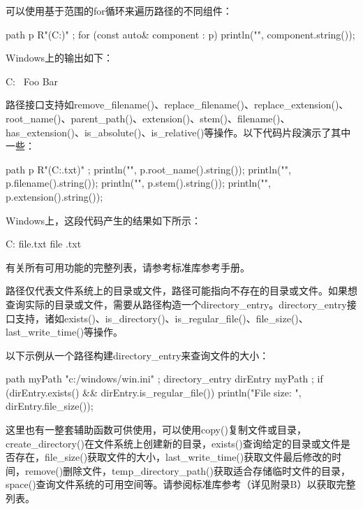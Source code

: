 可以使用基于范围的for循环来遍历路径的不同组件：

\begin{cpp}
path p { R"(C:\Foo\Bar)" };
for (const auto& component : p) {
    println("{}", component.string());
}
\end{cpp}

Windows上的输出如下：

\begin{cpp}
C:
\
Foo
Bar
\end{cpp}

路径接口支持如remove\_filename()、replace\_filename()、replace\_extension()、root\_name()、parent\_path()、extension()、stem()、filename()、has\_extension()、is\_absolute()、is\_relative()等操作。以下代码片段演示了其中一些：

\begin{cpp}
path p { R"(C:\Foo\Bar\file.txt)" };
println("{}", p.root_name().string());
println("{}", p.filename().string());
println("{}", p.stem().string());
println("{}", p.extension().string());
\end{cpp}

Windows上，这段代码产生的结果如下所示：

\begin{shell}
C:
file.txt
file
.txt
\end{shell}

有关所有可用功能的完整列表，请参考标准库参考手册。

\mySubsubsection{13.6.2.}{目录}

路径仅代表文件系统上的目录或文件，路径可能指向不存在的目录或文件。如果想查询实际的目录或文件，需要从路径构造一个directory\_entry。directory\_entry接口支持，诸如exists()、is\_directory()、is\_regular\_file()、file\_size()、last\_write\_time()等操作。

以下示例从一个路径构建directory\_entry来查询文件的大小：

\begin{cpp}
path myPath { "c:/windows/win.ini" };
directory_entry dirEntry { myPath };
if (dirEntry.exists() && dirEntry.is_regular_file()) {
    println("File size: {}", dirEntry.file_size());
}
\end{cpp}


这里也有一整套辅助函数可供使用，可以使用copy()复制文件或目录，create\_directory()在文件系统上创建新的目录，exists()查询给定的目录或文件是否存在，file\_size()获取文件的大小，last\_write\_time()获取文件最后修改的时间，remove()删除文件，temp\_directory\_path()获取适合存储临时文件的目录，space()查询文件系统的可用空间等。请参阅标准库参考（详见附录B）以获取完整列表。

